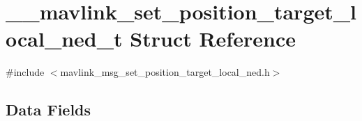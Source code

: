\hypertarget{struct____mavlink__set__position__target__local__ned__t}{\section{\+\_\+\+\_\+mavlink\+\_\+set\+\_\+position\+\_\+target\+\_\+local\+\_\+ned\+\_\+t Struct Reference}
\label{struct____mavlink__set__position__target__local__ned__t}
}


{\ttfamily \#include $<$mavlink\+\_\+msg\+\_\+set\+\_\+position\+\_\+target\+\_\+local\+\_\+ned.\+h$>$}

\subsection*{Data Fields}
